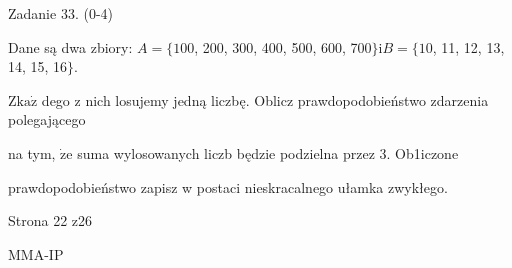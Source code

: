 \documentclass[a4paper,12pt]{article}
\begin{document}
Zadanie 33. (0-4)

Dane są dwa zbiory: $A=\{100$, 200, 300, 400, 500, 600, 700$\} \mathrm{i} B=\{10$, 11, 12, 13, 14, 15, 16$\}.$

$\mathrm{Z}\mathrm{k}\mathrm{a}\dot{\mathrm{z}}$ dego z nich losujemy jedną liczbę. Oblicz prawdopodobieństwo zdarzenia polegającego

na tym, $\dot{\mathrm{z}}\mathrm{e}$ suma wylosowanych liczb będzie podzielna przez 3. Ob1iczone

prawdopodobieństwo zapisz w postaci nieskracalnego ułamka zwykłego.

Strona 22 z26

MMA-IP
\end{document}
